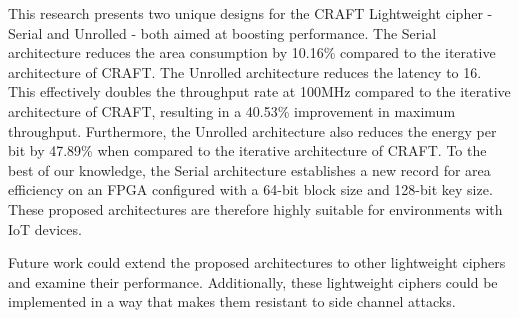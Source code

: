 \documentclass[final,5p,times,twocolumn]{elsarticle}
\begin{document}
This research presents two unique designs for the CRAFT Lightweight cipher - Serial and Unrolled - both aimed at boosting performance. The Serial architecture reduces the area consumption by 10.16\% compared to the iterative architecture of CRAFT.
The Unrolled architecture reduces the latency to 16. This effectively doubles the throughput rate at 100MHz compared to the iterative architecture of CRAFT, resulting in a 40.53\% improvement in maximum throughput. Furthermore, the Unrolled architecture also reduces the energy per bit by 47.89\% when compared to the iterative architecture of CRAFT.
To the best of our knowledge, the Serial architecture establishes a new record for area efficiency on an FPGA configured with a 64-bit block size and 128-bit key size.
These proposed architectures are therefore highly suitable for environments with IoT devices.


Future work could extend the proposed architectures to other lightweight ciphers and examine their performance. Additionally, these lightweight ciphers could be implemented in a way that makes them resistant to side channel attacks.





\end{document}
